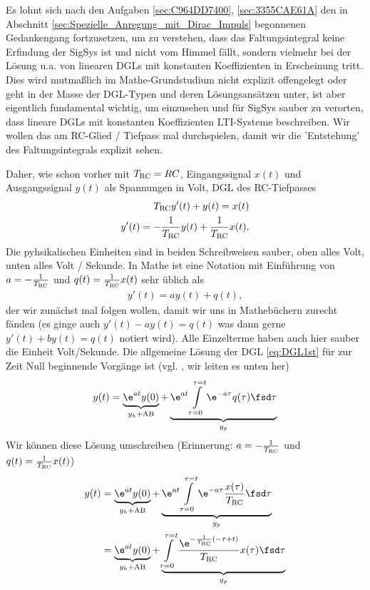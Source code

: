 Es lohnt sich nach den Aufgaben \ref{sec:C964DD7400}, \ref{sec:3355CAE61A} den in Abschnitt \ref{sec:Spezielle_Anregung_mit_Dirac_Impuls} begonnenen Gedankengang fortzusetzen, um zu verstehen, dass das Faltungsintegral keine Erfindung der SigSys ist und nicht vom Himmel fällt, sondern vielmehr bei der Lösung u.a. von linearen DGLs mit konstanten Koeffizienten in Erscheinung tritt. Dies wird mutmaßlich im Mathe-Grundstudium nicht explizit offengelegt oder geht in der Masse der DGL-Typen und deren Lösungsansätzen unter, ist aber eigentlich fundamental wichtig, um einzusehen und für SigSys sauber zu verorten, dass lineare DGLs mit konstanten Koeffizienten LTI-Systeme beschreiben.
%
Wir wollen das am RC-Glied / Tiefpass mal durchspielen, damit wir die 'Entstehung' des Faltungsintegrals explizit sehen.

Daher, wie schon vorher mit $T_\text{RC}=R C$, Eingangssignal $x(t)$ und Ausgangssignal $y(t)$ als Spannungen in Volt, DGL des RC-Tiefpasses
\begin{align}
T_\text{RC} y'(t) + y(t) = x(t)\\
y'(t) = - \frac{1}{T_\text{RC}}y(t) + \frac{1}{T_\text{RC}} x(t).
\end{align}
Die pyhsikalischen Einheiten sind in beiden Schreibweisen sauber, oben alles Volt, unten alles Volt / Sekunde.
%
In Mathe ist eine Notation mit Einführung von $a = -\frac{1}{T_\text{RC}}$ und $q(t) = \frac{1}{T_\text{RC}} x(t)$ sehr üblich als
\begin{align}
\label{eq:DGL1st}
y'(t) = a y(t) + q(t),
\end{align}
der wir zunächst mal folgen wollen, damit wir uns in Mathebüchern zurecht fänden (es ginge auch $y'(t) -a y(t) =  q(t)$ was dann gerne $y'(t) + b y(t) =  q(t)$ notiert wird). Alle Einzelterme haben auch hier sauber die Einheit Volt/Sekunde.
%
Die allgemeine Lösung der DGL \eqref{eq:DGL1st} für zur Zeit Null beginnende Vorgänge ist (vgl. \cite[S.19, Glg. (4)]{Strang2014}, wir leiten es unten her)
\begin{align}
\label{eq:DGL1st_full_solution_with_conv}
y(t) = \underbrace{\e^{a t} y(0)}_{y_h+\text{AB}} + \underbrace{\e^{a t}\int\limits_{\tau=0}^{\tau=t} \e^{-a \tau} q(\tau) \fsd \tau}_{y_p}
\end{align}
Wir können diese Lösung umschreiben (Erinnerung: $a = -\frac{1}{T_\text{RC}}$ und $q(t) = \frac{1}{T_\text{RC}} x(t)$)
\begin{align}
y(t) &= \underbrace{\e^{a t} y(0)}_{y_h+\text{AB}} + \underbrace{\e^{a t}\int\limits_{\tau=0}^{\tau=t} \e^{-a \tau} \frac{x(\tau)}{\TRC} \fsd \tau}_{y_p}\\
&= \underbrace{\e^{a t} y(0)}_{y_h+\text{AB}} + \underbrace{\int\limits_{\tau=0}^{\tau=t} \frac{\e^{-\frac{1}{\TRC} (-\tau + t)}}{\TRC} x(\tau) \fsd \tau}_{y_p}
\end{align}
